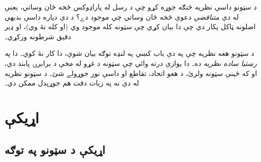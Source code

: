 \documentclass[12pt,a4paper,oneside]{report}
\newcommand{\Setabs}[2]{\{#1 : #2\}}
\newcommand{\olfileid}[3]{\gdef\pspart{#1}\gdef\pschapter{#2}\gdef\pssection{#3}}
\newcommand{\olchapter}[3]{\gdef\pspart{#1}\gdef\pschapter{#2}\gdef\pssection{}\chapter{#3}\label{#1:#2::chap}}
\newcommand{\olsection}[1]{\section{#1}\label{\pspart:\pschapter:\pssection:sec}}
\newenvironment{digress}{\par\medskip}{\par\medskip}
\begin{document}
\begin{digress}
د سټونو داسې نظريه څنګه جوړه کړو چې د رسل له پاراډوکس څخه ځان وساتي، يعنې له دې \emph{متناقضې} دعوې څخه ځان وساتي چې \LR{$R = \Setabs{x}{x \notin x}$} موجود دے؟ د دې دپاره داسې بديهي اصلونه ټاکل پکار دي چې دا بيان کړي چې سټونه کله موجود وي (او کله نۀ وي)، او ډېر دقيق شرطونه ورکړي۔

د سټونو هغه نظريه چې په دې باب کښې په لنډه توګه بيان شوې، دا کار نۀ کوي۔ دا \emph{په رښتيا ساده نظريه} ده۔ دا يوازې درته وائي چې سټونه د غړو له مخې د برابرۍ پابند دي، او که ځينې سټونه ولرئ، د هغو اتحاد، تقاطع او داسې نور جوړولے شئ۔ د سټونو نظريه له دې نه په زيات دقت هم جوړېدل ممکن دي۔ 
\end{digress}



\olchapter{sfr}{rel}{اړيکې}


\olfileid{sfr}{rel}{set}
\olsection{اړيکې د سټونو په توګه}
\end{document}
